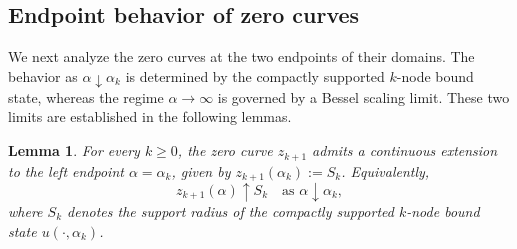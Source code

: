 \documentclass[11pt]{article}
\newtheorem{lemma}[theorem]{Lemma}
\begin{document}
\subsection{Endpoint behavior of zero curves}
We next analyze the zero curves at the two endpoints of their domains.
The behavior as \(\alpha\downarrow\alpha_k\) is determined by the
compactly supported \(k\)-node bound state, whereas the regime
\(\alpha\to\infty\) is governed by a Bessel scaling limit. These two
limits are established in the following lemmas.
\begin{lemma}

For every \(k\geq0\), the zero curve \(z_{k+1}\) admits a continuous
extension to the left endpoint \(\alpha=\alpha_k\), given by $z_{k+1}(\alpha_k):=S_k$. Equivalently,
\begin{equation}
 z_{k+1}(\alpha)\uparrow S_k\quad \text{as }\alpha\downarrow\alpha_k,
 \label{eq:sublinear-left-limit}
\end{equation}
where \(S_k\) denotes the support radius of the compactly supported
\(k\)-node bound state $u(\cdot,\alpha_k)$.
\end{lemma}
\end{document}
